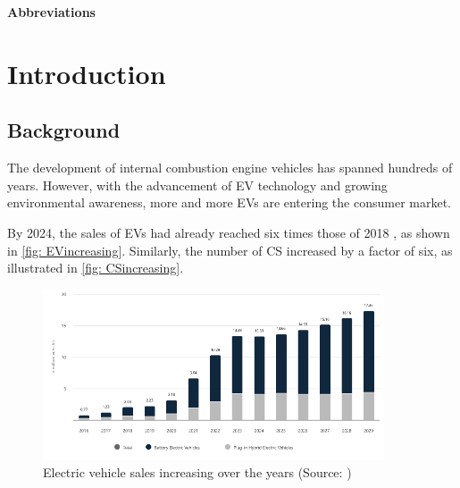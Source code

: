 \documentclass[
	english,
	ruledheaders=section,%
	class=report,%
	thesis={type=Report},%
	accentcolor=9c,%
	custommargins=true,%
	marginpar=false,%
	parskip=half-,%
	fontsize=11pt,%
	logofile={img/tuda_logo.pdf}, %
]{tudapub}
\begin{document}
\tableofcontents

\clearpage
\textbf{Abbreviations} 

\listoffigures
\listoftables


\chapter{Introduction}
\label{chap: introduction}

\section{Background}




The development of internal combustion engine vehicles has spanned hundreds of years. However, with the advancement of \ac{EV} technology and growing environmental awareness, more and more \ac{EV}s are entering the consumer market. 

By 2024, the sales of \ac{EV}s had already reached six times those of 2018 \cite{EAutostatistik}, as shown in \autoref{fig: EVincreasing}. Similarly, the number of \ac{CS} increased by a factor of six, as illustrated in \autoref{fig: CSincreasing}. 

\begin{figure}[H]
    \centering
    \includegraphics[width=0.9\textwidth]{img/EV_Sales_Diagramm.png} 
    \caption{Electric vehicle sales increasing over the years
    (Source: \cite{EAutostatistik})}
    \label{fig: EVincreasing}
\end{figure}
\end{document}
